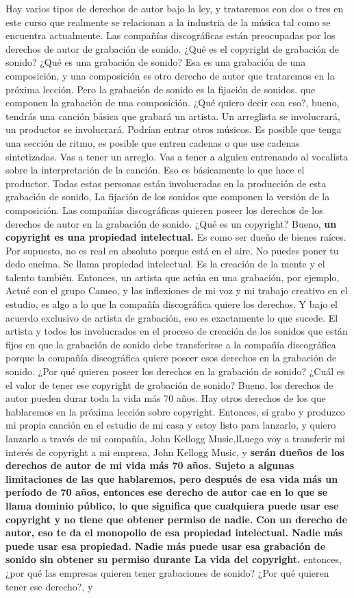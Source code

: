 \documentclass[10pt]{book}
\begin{document}
Hay varios tipos de derechos de autor bajo la ley, y trataremos con dos o tres en este curso que realmente se relacionan a la industria de la música tal como se encuentra actualmente. Las compañías discográficas están preocupadas por los derechos de autor de grabación de sonido. ¿Qué es el copyright de grabación de sonido? ¿Qué es una grabación de sonido? Esa es una grabación de una composición, y una composición es otro derecho de autor que trataremos en la próxima lección. Pero la grabación de sonido es la fijación de sonidos. que componen la grabación de una composición. ¿Qué quiero decir con eso?, bueno, tendrás una canción básica que grabará un artista. Un arreglista se involucrará, un productor se involucrará. Podrían entrar otros músicos. Es posible que tenga una sección de ritmo, es posible que entren cadenas o que use cadenas sintetizadas. Vas a tener un arreglo. Vas a tener a alguien entrenando al vocalista sobre la interpretación de la canción. Eso es básicamente lo que hace el productor. Todas estas personas están involucradas en la producción de esta grabación de sonido, La fijación de los sonidos que componen la versión de la composición. Las compañías discográficas quieren poseer los derechos de los derechos de autor en la grabación de sonido. ¿Qué es un copyright? Bueno, \textbf{un copyright es una propiedad intelectual.} Es como ser dueño de bienes raíces. Por supuesto, no es real en absoluto porque está en el aire. No puedes poner tu dedo encima. Se llama propiedad intelectual. Es la creación de la mente y el talento también. Entonces, un artista que actúa en una grabación, por ejemplo, Actué con el grupo Cameo, y las inflexiones de mi voz y mi trabajo creativo en el estudio, es algo a lo que la compañía discográfica quiere los derechos. Y bajo el acuerdo exclusivo de artista de grabación, eso es exactamente lo que sucede. El artista y todos los involucrados en el proceso de creación de los sonidos que están fijos en que la grabación de sonido debe transferirse a la compañía discográfica porque la compañía discográfica quiere poseer esos derechos en la grabación de sonido. ¿Por qué quieren poseer los derechos en la grabación de sonido? ¿Cuál es el valor de tener ese copyright de grabación de sonido? Bueno, los derechos de autor pueden durar toda la vida más 70 años. Hay otros derechos de los que hablaremos en la próxima lección sobre copyright. Entonces, si grabo y produzco mi propia canción en el estudio de mi casa y estoy listo para lanzarlo, y quiero lanzarlo a través de mi compañía, John Kellogg Music,lLuego voy a transferir mi interés de copyright a mi empresa, John Kellogg Music, y \textbf{serán dueños de los derechos de autor de mi vida más 70 años. Sujeto a algunas limitaciones de las que hablaremos, pero después de esa vida más un período de 70 años, entonces ese derecho de autor cae en lo que se llama dominio público, lo que significa que cualquiera puede usar ese copyright y no tiene que obtener permiso de nadie.} \textbf{Con un derecho de autor, eso te da el monopolio de esa propiedad intelectual. Nadie más puede usar esa propiedad. Nadie más puede usar esa grabación de sonido sin obtener su permiso durante La vida del copyright.} entonces, ¿por qué las empresas quieren tener grabaciones de sonido? ¿Por qué quieren tener ese derecho?, y  
\end{document}
